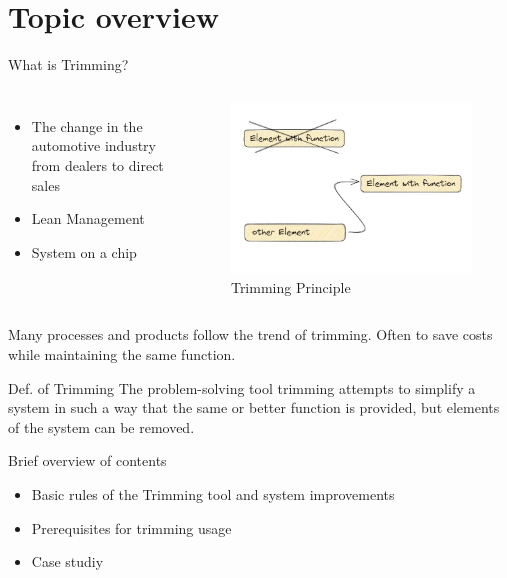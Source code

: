 \documentclass{beamer}
\title{Problem Solving Tools - Trimming
	\vskip1em}
\subtitle{Module System Modelling and Semantic Web}
\author{Carsten Lehmann}
\date{June 21 2022}
\begin{document}
	\begin{frame}[plain]
		\maketitle
	\end{frame}

	\section{Topic overview}
	
	\begin{frame}{What is Trimming?}
		\begin{columns}
			\begin{itemize}
				\item The change in the automotive industry from dealers to direct sales
				\item Lean Management 
				\item System on a chip
			\end{itemize}
			\begin{figure}
				\centering
			\includegraphics[width=.7\textwidth]{img/Intro.jpg}
				\caption{Trimming Principle}
			\end{figure}	
		\end{columns}
		Many processes and products follow the trend of trimming. Often to save costs while maintaining the same function.
	\end{frame}
	
	\begin{frame}{Def. of Trimming}
		The problem-solving tool trimming attempts to simplify a system in such a way that the same or better function is provided, but elements of the system can be removed.
	\end{frame}
	
	\begin{frame}{Brief overview of contents}
		\begin{itemize}
			\item Basic rules of the Trimming tool and system improvements
			\item Prerequisites for trimming usage
			\item Case studiy
		\end{itemize}
	\end{frame}
	
\end{document}
